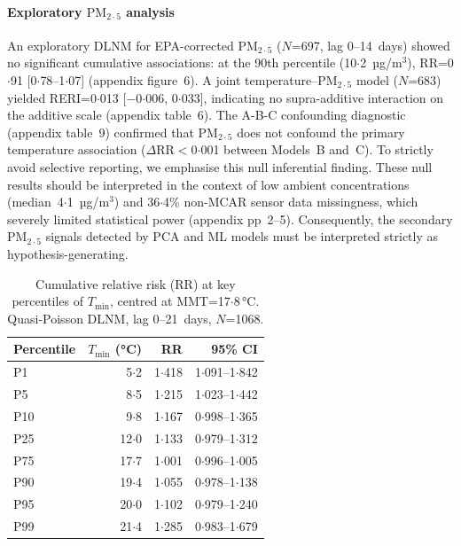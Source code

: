 \documentclass[review,number]{elsarticle}
\begin{document}
\paragraph{Exploratory $\text{PM}_{2{\cdot}5}$ analysis}
An exploratory DLNM for EPA-corrected $\text{PM}_{2{\cdot}5}$ ($N$=697,
lag 0--14~days) showed no significant cumulative associations: at the
90th percentile (10${\cdot}$2~µg/m$^3$), RR=0${\cdot}$91
[0${\cdot}$78--1${\cdot}$07] (appendix figure~6). A joint temperature--$\text{PM}_{2{\cdot}5}$
model ($N$=683) yielded RERI=0${\cdot}$013 [$-$0${\cdot}$006,
0${\cdot}$033], indicating no supra-additive interaction on the
additive scale (appendix table~6). The A-B-C confounding diagnostic
(appendix table~9) confirmed that $\text{PM}_{2{\cdot}5}$ does not confound the
primary temperature association ($\Delta$RR$<$0${\cdot}$001 between
Models~B and~C). To strictly avoid selective reporting, we emphasise this null
inferential finding. These null results should be interpreted in the
context of low ambient concentrations (median~4${\cdot}$1~µg/m$^3$)
and 36${\cdot}$4\% non-MCAR sensor data missingness, which severely
limited statistical power (appendix pp~2--5). Consequently,
the secondary $\text{PM}_{2{\cdot}5}$ signals detected by PCA and ML models
must be interpreted strictly as hypothesis-generating.

\begin{table}[ht]
\centering
\caption{Cumulative relative risk (RR) at key percentiles of
$T_\mathrm{min}$, centred at MMT=17${\cdot}$8\,°C. Quasi-Poisson DLNM,
lag 0--21~days, $N$=1068.}
\label{tab:dlnm_temp_rr}
\begin{tabular}{lrrr}
\toprule
Percentile & $T_\mathrm{min}$ (°C) & RR & 95\% CI \\
\midrule
P1  &  5${\cdot}$2 & 1${\cdot}$418 & 1${\cdot}$091--1${\cdot}$842 \\
P5  &  8${\cdot}$5 & 1${\cdot}$215 & 1${\cdot}$023--1${\cdot}$442 \\
P10 &  9${\cdot}$8 & 1${\cdot}$167 & 0${\cdot}$998--1${\cdot}$365 \\
P25 & 12${\cdot}$0 & 1${\cdot}$133 & 0${\cdot}$979--1${\cdot}$312 \\
P75 & 17${\cdot}$7 & 1${\cdot}$001 & 0${\cdot}$996--1${\cdot}$005 \\
P90 & 19${\cdot}$4 & 1${\cdot}$055 & 0${\cdot}$978--1${\cdot}$138 \\
P95 & 20${\cdot}$0 & 1${\cdot}$102 & 0${\cdot}$979--1${\cdot}$240 \\
P99 & 21${\cdot}$4 & 1${\cdot}$285 & 0${\cdot}$983--1${\cdot}$679 \\
\bottomrule
\end{tabular}
\end{table}
\end{document}
